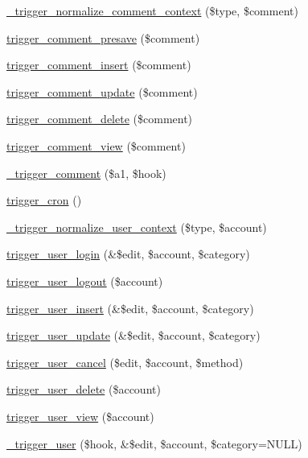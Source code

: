 \begin{DoxyCompactItemize}
\item 
\hyperlink{trigger_8module_ad3740e2f88ee061a1759d1e619d5747f}{\_\-trigger\_\-normalize\_\-comment\_\-context} (\$type, \$comment)
\item 
\hyperlink{trigger_8module_a5cfb14fd7c7831d620e63e414ed58fd2}{trigger\_\-comment\_\-presave} (\$comment)
\item 
\hyperlink{trigger_8module_ae3d50a8adaedb298afba9d4f9595ccd1}{trigger\_\-comment\_\-insert} (\$comment)
\item 
\hyperlink{trigger_8module_a816f11378edc4880420922ae9fc63474}{trigger\_\-comment\_\-update} (\$comment)
\item 
\hyperlink{trigger_8module_a3148e799e1bdbe733b0547f6347633b0}{trigger\_\-comment\_\-delete} (\$comment)
\item 
\hyperlink{trigger_8module_a6d08bf541ce68a761ffb4b430f83f195}{trigger\_\-comment\_\-view} (\$comment)
\item 
\hyperlink{trigger_8module_a85c6ae6ff856807651018048c8103ed7}{\_\-trigger\_\-comment} (\$a1, \$hook)
\item 
\hyperlink{trigger_8module_a61f5a9a5793885927dbebc05e5420647}{trigger\_\-cron} ()
\item 
\hyperlink{trigger_8module_af7fb52a5819839211a9a8544d71aada9}{\_\-trigger\_\-normalize\_\-user\_\-context} (\$type, \$account)
\item 
\hyperlink{trigger_8module_a2957541441d3ecd139d7d4e295739c43}{trigger\_\-user\_\-login} (\&\$edit, \$account, \$category)
\item 
\hyperlink{trigger_8module_a93a000d39a65cd065a881e453d6d95ca}{trigger\_\-user\_\-logout} (\$account)
\item 
\hyperlink{trigger_8module_addce21e705c500c2172debc5a634056c}{trigger\_\-user\_\-insert} (\&\$edit, \$account, \$category)
\item 
\hyperlink{trigger_8module_a316a4118499482b641a29a9dca124d5c}{trigger\_\-user\_\-update} (\&\$edit, \$account, \$category)
\item 
\hyperlink{trigger_8module_a4916950219650ff95ca978fe761021b8}{trigger\_\-user\_\-cancel} (\$edit, \$account, \$method)
\item 
\hyperlink{trigger_8module_aeee8f35a9021d3eccd2290bf4be6b054}{trigger\_\-user\_\-delete} (\$account)
\item 
\hyperlink{trigger_8module_a6c0e4f792bf7612b612e22305d93c6fb}{trigger\_\-user\_\-view} (\$account)
\item 
\hyperlink{trigger_8module_ac2a775158a19f82796e05b0ecb9736bd}{\_\-trigger\_\-user} (\$hook, \&\$edit, \$account, \$category=NULL)

\end{DoxyCompactItemize}
